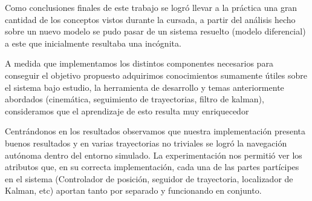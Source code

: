 Como conclusiones finales de este trabajo se logró llevar a la práctica una gran cantidad de los conceptos vistos durante la cursada, a partir del análisis hecho sobre un nuevo modelo se pudo pasar de un sistema resuelto (modelo diferencial) a este que inicialmente resultaba una incógnita. 

A medida que implementamos los distintos componentes necesarios para conseguir el objetivo propuesto adquirimos conocimientos sumamente útiles sobre el sistema bajo estudio, la herramienta de desarrollo y temas anteriormente abordados (cinemática, seguimiento de trayectorias, filtro de kalman), consideramos que el aprendizaje de esto resulta muy enriquecedor 

Centrándonos en los resultados observamos que nuestra implementación presenta buenos resultados y en varias trayectorias no triviales se logró la navegación autónoma dentro del entorno simulado. La experimentación nos permitió ver los atributos que, en su correcta implementación, cada una de las partes partícipes en el sistema (Controlador de posición, seguidor de trayectoria, localizador de Kalman, etc) aportan tanto por separado y funcionando en conjunto.



